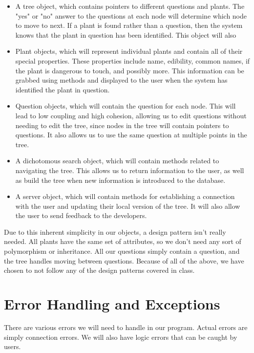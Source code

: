 \documentclass[a4paper]{article}
\begin{document}
\begin{itemize}
\item A tree object, which contains pointers to different questions and plants. The "yes" or "no" answer to the questions at each node will determine which node to move to next. If a plant is found rather than a question, then the system knows that the plant in question has been identified. This object will also 
\item Plant objects, which will represent individual plants and contain all of their special properties. These properties include name, edibility, common names, if the plant is dangerous to touch, and possibly more. This information can be grabbed using methods and displayed to the user when the system has identified the plant in question.
\item Question objects, which will contain the question for each node. This will lead to low coupling and high cohesion, allowing us to edit questions without needing to edit the tree, since nodes in the tree will contain pointers to questions. It also allows us to use the same question at multiple points in the tree.
\item A dichotomous search object, which will contain methods related to navigating the tree. This allows us to return information to the user, as well as build the tree when new information is introduced to the database.
\item A server object, which will contain methods for establishing a connection with the user and updating their local version of the tree. It will also allow the user to send feedback to the developers.
\end{itemize}

Due to this inherent simplicity in our objects, a design pattern isn't really needed. All plants have the same set of attributes, so we don't need any sort of polymorphism or inheritance. All our questions simply contain a question, and the tree handles moving between questions. Because of all of the above, we have chosen to not follow any of the design patterns covered in class. 

\pagebreak

\section{Error Handling and Exceptions}

There are various errors we will need to handle in our program. Actual errors are simply connection errors. We will also have logic errors that can be caught by users.
\end{document}
